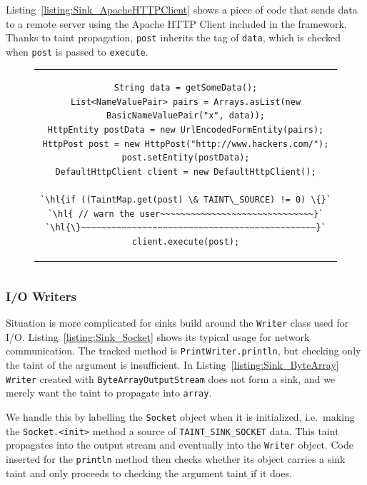 \documentclass[12pt,twoside,notitlepage]{report}
\begin{document}
Listing~\ref{listing:Sink_ApacheHTTPClient} shows a piece of code that sends data to a remote server using the Apache HTTP Client included in the framework. Thanks to taint propagation, \verb$post$ inherits the tag of \verb$data$, which is checked when \verb$post$ is passed to \verb$execute$.

\begin{figure}[h]
	\centering
	\begin{tabular}{c}
	\begin{lstlisting}
String data = getSomeData();
List<NameValuePair> pairs = Arrays.asList(new BasicNameValuePair("x", data));
HttpEntity postData = new UrlEncodedFormEntity(pairs);
HttpPost post = new HttpPost("http://www.hackers.com/");
post.setEntity(postData);
DefaultHttpClient client = new DefaultHttpClient();

`\hl{if ((TaintMap.get(post) \& TAINT\_SOURCE) != 0) \{}`
`\hl{ // warn the user~~~~~~~~~~~~~~~~~~~~~~~~~~~~~~}`
`\hl{\}~~~~~~~~~~~~~~~~~~~~~~~~~~~~~~~~~~~~~~~~~~~~~~}`
client.execute(post);
	\end{lstlisting}
	\end{tabular}
	\begin{lstlisting}[caption={HTTP request using the Apache client, with sink instrumentation},
	                   label={listing:Sink_ApacheHTTPClient}]
	\end{lstlisting}
\end{figure}

\subsubsection{I/O Writers}

Situation is more complicated for sinks build around the \verb$Writer$ class used for I/O. Listing~\ref{listing:Sink_Socket} shows its typical usage for network communication. The tracked method is \verb$PrintWriter.println$, but checking only the taint of the argument is insufficient. In Listing~\ref{listing:Sink_ByteArray} \verb$Writer$ created with \verb$ByteArrayOutputStream$ does not form a sink, and we merely want the taint to propagate into \verb$array$. 

We handle this by labelling the \verb$Socket$ object when it is initialized, i.e.\ making the \verb$Socket.<init>$ method a source of \verb$TAINT_SINK_SOCKET$ data. This taint propagates into the output stream and eventually into the \verb$Writer$ object. Code inserted for the \verb$println$ method then checks whether its object carries a sink taint and only proceeds to checking the argument taint if it does.
\end{document}
